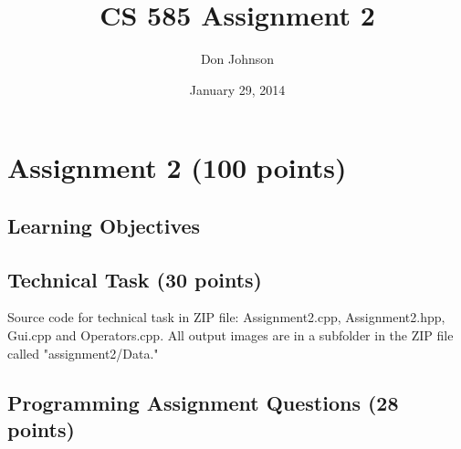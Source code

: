 \documentclass{article}
\title{CS 585 Assignment 2}
\author{Don Johnson}
\date{January 29, 2014}
\begin{document}
\maketitle
\section{Assignment 2 (100 points)}
\subsection{Learning Objectives}
\subsection{Technical Task (30 points)}
Source code for technical task in ZIP file: Assignment2.cpp, Assignment2.hpp, Gui.cpp and Operators.cpp. All output images are in a subfolder in the ZIP file called "assignment2/Data."

\subsection{Programming Assignment Questions (28 points)}
\end{document}

